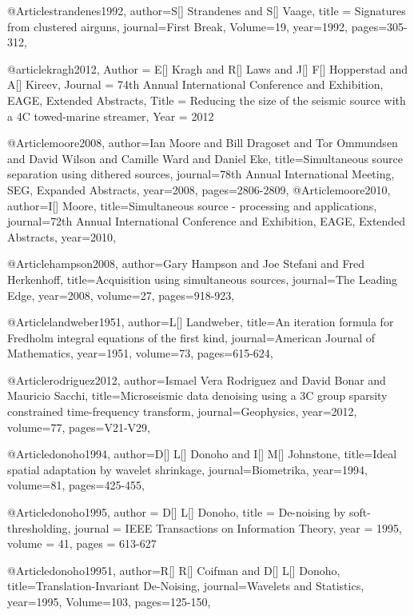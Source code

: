 @Article{strandenes1992,
  author={S[] Strandenes and S[] Vaage},
  title = {Signatures from clustered airguns},
  journal={First Break},
  Volume=19,
  year=1992,
  pages={305-312},
}

@article{kragh2012,
	Author = {E[] Kragh and R[] Laws and J[] F[] Hopperstad and A[] Kireev},
	Journal = {74th Annual International Conference and Exhibition, EAGE, Extended Abstracts},
	Title = {Reducing the size of the seismic source with a 4C towed-marine streamer},
	Year = {2012}}


@Article{moore2008,
  author={Ian Moore and Bill Dragoset and Tor Ommundsen and David Wilson and Camille Ward and Daniel Eke},
  title={Simultaneous source separation using dithered sources},
  journal={78th Annual International Meeting, SEG, Expanded Abstracts},
  year=2008,
  pages={2806-2809},
}
@Article{moore2010,
  author={I[] Moore},
  title={Simultaneous source - processing and applications},
  journal={72th Annual International Conference and Exhibition, EAGE, Extended Abstracts},
  year=2010,
}


@Article{hampson2008,
  author={Gary Hampson and Joe Stefani and Fred Herkenhoff},
  title={Acquisition using simultaneous sources},
  journal={The Leading Edge},
  year=2008,
  volume=27,
  pages={918-923},
}

@Article{landweber1951,
  author={L[] Landweber},
  title={An iteration formula for Fredholm integral equations of the first kind},
  journal={American Journal of Mathematics},
  year=1951,
  volume=73,
  pages={615-624},
}

@Article{rodriguez2012,
  author={Ismael Vera Rodriguez and David Bonar and Mauricio Sacchi},
  title={Microseismic data denoising using a 3C group sparsity constrained time-frequency transform},
  journal={Geophysics},
  year=2012,
  volume=77,
  pages={V21-V29},
}

@Article{donoho1994,
  author={D[] L[] Donoho and I[] M[] Johnstone},
  title={Ideal spatial adaptation by wavelet shrinkage},
  journal={Biometrika},
  year=1994,
  volume=81,
  pages={425-455},
}

@Article{donoho1995,
  author =  {D[] L[] Donoho},
  title =   {De-noising by soft-thresholding},
  journal = {IEEE Transactions on Information Theory},
  year =    {1995},
  volume =  {41},
  pages =   {613-627}
}


@Article{donoho19951,
  author={R[] R[] Coifman and D[] L[] Donoho},
  title={Translation-Invariant De-Noising},
  journal={Wavelets and Statistics},
  year=1995,
  Volume=103,
  pages={125-150},
}


